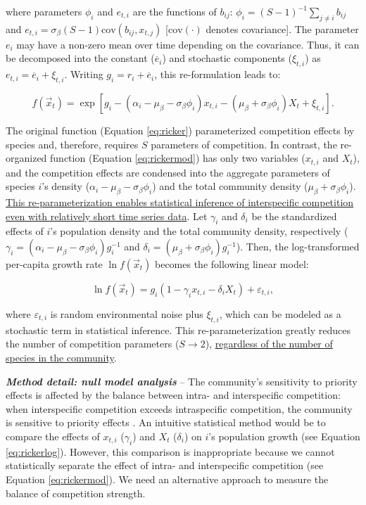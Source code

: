 \documentclass[12pt, class=article, crop=false]{standalone}
\begin{document}
where parameters $\phi_{i}$ and $e_{t,i}$ are the functions of $b_{ij}$: $\phi_i = (S-1)^{-1}\sum_{j \ne i} b_{ij}$ and $e_{t,i} = \sigma_{\beta} (S - 1) \mbox{cov}(b_{ij}, x_{t,j})$ [$\mbox{cov}(\cdot)$ denotes covariance].
The parameter $e_i$ may have a non-zero mean over time depending on the covariance.
Thus, it can be decomposed into the constant ($\overline{e}_i$) and stochastic components ($\xi_{t,i}$) as $e_{t,i} = \overline{e}_i + \xi_{t,i}$.
Writing $g_{i} = r_i + \overline{e}_i$, this re-formulation leads to:

\begin{equation}
\label{eq:rickermod}
    f(\overset{\rightarrow}{x}_{t}) = \exp\left[g_{i} - (\alpha_i - \mu_{\beta} - \sigma_{\beta} \phi_i) x_{t,i} - (\mu_{\beta} +  \sigma_{\beta} \phi_i) X_t + \xi_{t,i} \right].
\end{equation}

The original function (Equation \ref{eq:ricker}) parameterized competition effects by species and, therefore, requires $S$ parameters of competition.
In contrast, the re-organized function (Equation \ref{eq:rickermod}) has only two variables ($x_{t,i}$ and $X_t$), and the competition effects are condensed into the aggregate parameters of species $i$'s density ($\alpha_i - \mu_{\beta} - \sigma_{\beta} \phi_i$) and the total community density ($\mu_{\beta} + \sigma_{\beta} \phi_i$).
\ul{This re-parameterization enables statistical inference of interspecific competition even with relatively short time series data}.
Let $\gamma_i$ and $\delta_i$ be the standardized effects of $i$'s population density and the total community density, respectively ($\gamma_i = (\alpha_i - \mu_{\beta} - \sigma_{\beta} \phi_i)g_i^{-1}$ and $\delta_i = (\mu_{\beta} + \sigma_{\beta} \phi_i)g_i^{-1}$).
Then, the log-transformed per-capita growth rate $\ln f(\overset{\rightarrow}{x}_{t})$ becomes the following linear model:

\begin{equation}
\label{eq:rickerlog}
    \ln f(\overset{\rightarrow}{x}_{t}) = g_i (1 - \gamma_i x_{t,i} - \delta_i X_t) + \varepsilon_{t,i},
\end{equation}

where $\varepsilon_{t,i}$ is random environmental noise plus $\xi_{t,i}$, which can be modeled as a stochastic term in statistical inference. This re-parameterization greatly reduces the number of competition parameters ($S \rightarrow 2$), \ul{regardless of the number of species in the community}.

\textbf{\textit{Method detail: null model analysis}} --
The community's sensitivity to priority effects is affected by the balance between intra- and interspecific competition: when interspecific competition exceeds intraspecific competition, the community is sensitive to priority effects \citep{ke_coexistence_2018}.
An intuitive statistical method would be to compare the effects of $x_{t,i}$ ($\gamma_i$) and $X_t$ ($\delta_i$) on $i$'s population growth (see Equation \ref{eq:rickerlog}).
However, this comparison is inappropriate because we cannot statistically separate the effect of intra- and interspecific competition (see Equation \ref{eq:rickermod}).
We need an alternative approach to measure the balance of competition strength.
\end{document}
